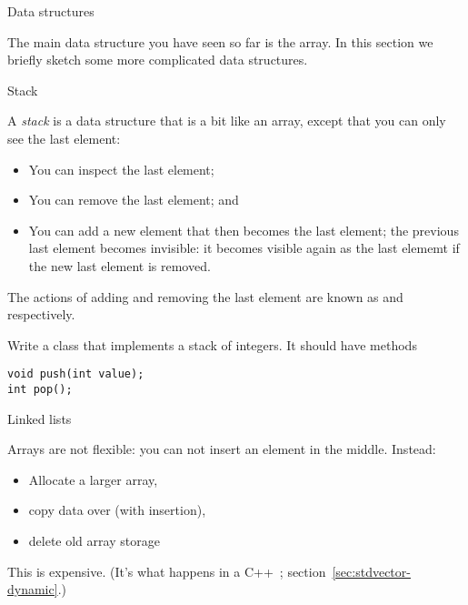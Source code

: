
 {Data structures}

The main data structure you have seen so far is the array. In this
section we briefly sketch some more complicated data structures.

 {Stack}

A \emph{stack} is a data structure that is a bit like an
array, except that you can only see the last element:
\begin{itemize}
\item You can inspect the last element;
\item You can remove the last element; and
\item You can add a new element that then becomes the last element;
  the previous last element becomes invisible: it becomes visible
  again as the last elememt if the new last element is removed.
\end{itemize}
The actions of adding and removing the last element are known as
 and  respectively.

\begin{exercise}
  Write a class that implements a stack of integers. It should have
  methods
\begin{lstlisting}
void push(int value);
int pop();
\end{lstlisting}
\end{exercise}


 {Linked lists}
\label{sec:linklist}

\prerequisite{\ref{ch:pointer}}

Arrays are not flexible: you can not insert an element in the
middle. Instead:
\begin{itemize}
\item Allocate a larger array,
\item copy data over (with insertion),
\item delete old array storage
\end{itemize}
This is expensive. (It's what happens in a
C++~; section~\ref{sec:stdvector-dynamic}.)


